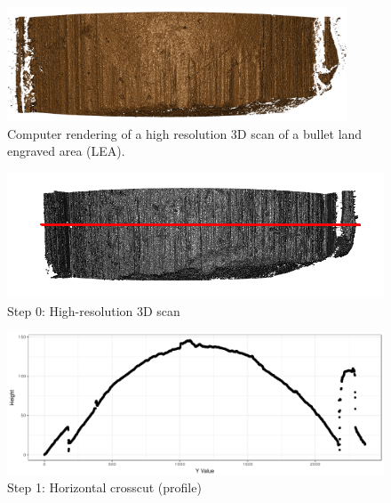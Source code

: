 \documentclass[12pt]{article}
\begin{document}
\begin{figure}
\centering
\includegraphics[width=0.9\textwidth]{../images/scan_example}
\caption{Computer rendering of a high resolution 3D scan of a bullet land engraved area (LEA).}
\label{scan-example}
\end{figure}

\begin{figure}
\begin{minipage}[b]{0.45\linewidth}
    \raggedleft
    \includegraphics[width=\textwidth]{../images/3d_plot_top_crosscut.png}
    \centering
    Step 0: High-resolution 3D scan
\end{minipage}
\hspace{.2cm}
\begin{minipage}[b]{0.45\linewidth}
    \raggedright
    \includegraphics[width=\textwidth]{../images/Profile_1.png}
    \centering
    Step 1: Horizontal crosscut (profile)
\end{minipage}
\vspace{.6cm}


\end{figure}
\end{document}

